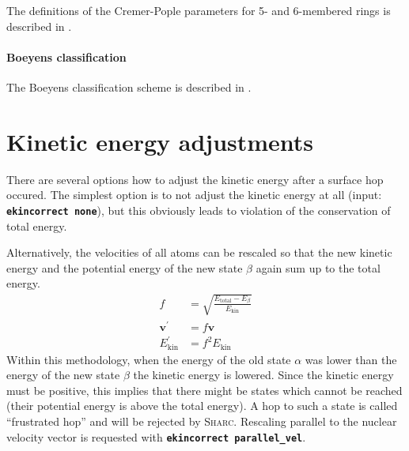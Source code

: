 \documentclass[a4paper,11pt,DIV=15,openany,twoside=false]{scrbook}
\newcommand{\sharc}{\textsc{Sharc}}
\newcommand{\ttt}[1]{\textbf{\texttt{#1}}}
\newcommand{\VEC}[1]{\ensuremath{\mathbf{#1}}}
\begin{document}
The definitions of the Cremer-Pople parameters for 5- and 6-membered rings is described in \cite{Cremer1975JACS}.

\paragraph{Boeyens classification}

The Boeyens classification scheme is described in \cite{Boeyens1976JCMS}.

\section{Kinetic energy adjustments}\label{met:ekinadj}

There are several options how to adjust the kinetic energy after a surface hop occured. The simplest option is to not adjust the kinetic energy at all (input: \ttt{ekincorrect none}), but this obviously leads to violation of the conservation of total energy.

Alternatively, the velocities of all atoms can be rescaled so that the new kinetic energy and the potential energy of the new state $\beta$ again sum up to the total energy.
\begin{align}
  f&=\sqrt{\frac{E_{\text{total}}-E_\beta}{E_{\text{kin}}}}\\
  \VEC{v}^\prime&=f\VEC{v}\\
  E_{\text{kin}}^\prime&=f^2E_{\text{kin}}
\end{align}
Within this methodology, when the energy of the old state $\alpha$ was lower than the energy of the new state $\beta$ the kinetic energy is lowered. Since the kinetic energy must be positive, this implies that there might be states which cannot be reached (their potential energy is above the total energy). A hop to such a state is called ``frustrated hop'' and will be rejected by \sharc. Rescaling parallel to the nuclear velocity vector is requested with \ttt{ekincorrect parallel\_vel}.
\end{document}
